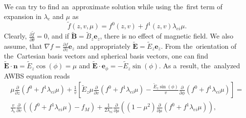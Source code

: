 \documentclass[preprint,12pt]{elsarticle}
\newcommand{\pdv}[2]{\frac{\partial{#1}}{\partial{#2}}}
\newcommand{\vect}[1]{\boldsymbol{#1}}
\newcommand{\mfpe}{\lambda_e}
\newcommand{\mfpei}{\lambda_{ei}}
\newcommand{\vmag}{v}
\newcommand{\vn}{\vect{n}}
\newcommand{\tE}{\vect{\tilde{E}}}
\newcommand{\tB}{\vect{\tilde{B}}}
\newcommand{\fM}{f_M}
\newcounter{bla}
\begin{document}
We can try to find an~approximate solution while using the~first term of
expansion in $\mfpe$ and $\mu$ as
\begin{equation}
  \tilde{f}(z, \vmag, \mu) = f^0(z, \vmag) + f^1(z, \vmag) \mfpei\mu .
  \label{eq:f_approximation}
\end{equation}
Clearly, $\pdv{\tilde{f}}{\theta} = 0$, and if $\tB = \tilde{B}_z\vect{e}_z$, 
there is no effect of magnetic field. We also assume, that 
$\nabla f = \pdv{f}{z}\vect{e}_z$ and appropriately 
$\tE = \tilde{E}_z\vect{e}_z$.
From the~orientation of the~Cartesian basis vectors and spherical 
basis vectors, one can find $\tE\cdot\vn = \tilde{E}_z \cos(\phi) = \mu$ and
$\tE\cdot\vect{e}_\phi = -\tilde{E}_z\sin(\phi)$. As a~result, the~analyzed
AWBS equation reads
\begin{multline}
  \mu\pdv{}{z}\left( f^0 + f^1 \mfpei\mu \right) 
  + \frac{1}{\vmag} \left[ \tilde{E}_z\mu \pdv{}{\vmag} 
  \left( f^0 + f^1 \mfpei\mu \right) 
  - \frac{\tilde{E}_z\sin(\phi)}{\vmag}\pdv{}{\phi} 
  \left( f^0 + f^1 \mfpei\mu \right)
  \right] 
  =\\
  \frac{\vmag}{\mfpe}\pdv{}{\vmag}
  \left(\left( f^0 + f^1 \mfpei\mu \right) -\fM\right)
  + \frac{1}{2 \mfpei}\pdv{}{\mu}\left((1 - \mu^2)
  \pdv{}{\mu}\left( f^0 + f^1 \mfpei\mu \right) \right) ,
  \label{eq:AWBS_spherical}
\end{multline}
\end{document}

